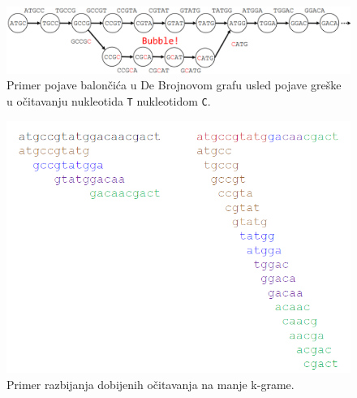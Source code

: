 \begin{figure}[h]
	\centering
	\includegraphics[width=\textwidth]{poglavlja/3/slike/baloncic.png}
	\caption{Primer pojave balon\v ci\'ca u De Brojnovom grafu usled pojave gre\v ske u o\v citavanju nukleotida \texttt{T} nukleotidom \texttt{C}.}
	\label{slika:baloncic}
\end{figure} 

\begin{figure}[h]
	\centering
	\includegraphics[width=\textwidth]{poglavlja/3/slike/razbijanje_na_manje_kgrame.png}
	\caption{Primer razbijanja dobijenih očitavanja na manje k-grame.}
	\label{slika:manji kgrami}
\end{figure}

\blankpage